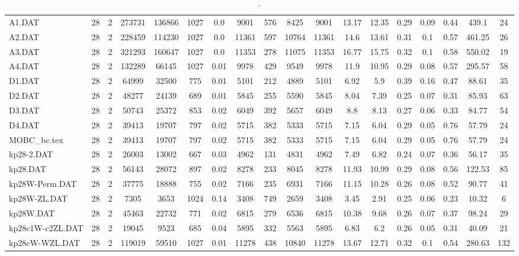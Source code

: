 \begin{sidewaystable}[h]
{\begin{tabular}{lccccccccccccccccc}
A1.DAT & 28 & 2 & 273731 & 136866 & 1027 & 0.0 & 9001 & 576 & 8425 & 9001 & 13.17 & 12.35 & 0.29 & 0.09 & 0.44 & 439.1 & 24\\
A2.DAT & 28 & 2 & 228459 & 114230 & 1027 & 0.0 & 11361 & 597 & 10764 & 11361 & 14.6 & 13.61 & 0.31 & 0.1 & 0.57 & 461.25 & 26\\
A3.DAT & 28 & 2 & 321293 & 160647 & 1027 & 0.0 & 11353 & 278 & 11075 & 11353 & 16.77 & 15.75 & 0.32 & 0.1 & 0.58 & 550.02 & 19\\
A4.DAT & 28 & 2 & 132289 & 66145 & 1027 & 0.01 & 9978 & 429 & 9549 & 9978 & 11.9 & 10.95 & 0.29 & 0.08 & 0.57 & 295.57 & 58\\
D1.DAT & 28 & 2 & 64999 & 32500 & 775 & 0.01 & 5101 & 212 & 4889 & 5101 & 6.92 & 5.9 & 0.39 & 0.16 & 0.47 & 88.61 & 35\\
D2.DAT & 28 & 2 & 48277 & 24139 & 689 & 0.01 & 5845 & 255 & 5590 & 5845 & 8.04 & 7.39 & 0.25 & 0.07 & 0.31 & 85.93 & 63\\
D3.DAT & 28 & 2 & 50743 & 25372 & 853 & 0.02 & 6049 & 392 & 5657 & 6049 & 8.8 & 8.13 & 0.27 & 0.06 & 0.33 & 84.77 & 54\\
D4.DAT & 28 & 2 & 39413 & 19707 & 797 & 0.02 & 5715 & 382 & 5333 & 5715 & 7.15 & 6.04 & 0.29 & 0.05 & 0.76 & 57.79 & 24\\
MOBC\_bc.tex & 28 & 2 & 39413 & 19707 & 797 & 0.02 & 5715 & 382 & 5333 & 5715 & 7.15 & 6.04 & 0.29 & 0.05 & 0.76 & 57.79 & 24\\
kp28-2.DAT & 28 & 2 & 26003 & 13002 & 667 & 0.03 & 4962 & 131 & 4831 & 4962 & 7.49 & 6.82 & 0.24 & 0.07 & 0.36 & 56.17 & 35\\
kp28.DAT & 28 & 2 & 56143 & 28072 & 897 & 0.02 & 8278 & 233 & 8045 & 8278 & 11.93 & 10.99 & 0.29 & 0.08 & 0.56 & 122.53 & 85\\
kp28W-Perm.DAT & 28 & 2 & 37775 & 18888 & 755 & 0.02 & 7166 & 235 & 6931 & 7166 & 11.15 & 10.28 & 0.26 & 0.08 & 0.52 & 90.77 & 41\\
kp28W-ZL.DAT & 28 & 2 & 7305 & 3653 & 1024 & 0.14 & 3408 & 749 & 2659 & 3408 & 3.45 & 2.91 & 0.25 & 0.06 & 0.23 & 10.32 & 6\\
kp28W.DAT & 28 & 2 & 45463 & 22732 & 771 & 0.02 & 6815 & 279 & 6536 & 6815 & 10.38 & 9.68 & 0.26 & 0.07 & 0.37 & 98.24 & 29\\
kp28c1W-c2ZL.DAT & 28 & 2 & 19045 & 9523 & 685 & 0.04 & 5895 & 332 & 5563 & 5895 & 6.83 & 6.2 & 0.26 & 0.05 & 0.31 & 40.09 & 21\\
kp28cW-WZL.DAT & 28 & 2 & 119019 & 59510 & 1027 & 0.01 & 11278 & 438 & 10840 & 11278 & 13.67 & 12.71 & 0.32 & 0.1 & 0.54 & 280.63 & 132\\
\bottomrule
\end{tabular}%
}%
\caption{.}
\label{tab:table_bc}
\end{sidewaystable}

